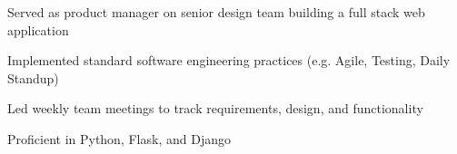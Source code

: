 \documentclass[]{latex/resume}
\begin{document}
\begin{minipage}[t]{0.75\textwidth}
    \sectionsep

     
    \begin{tightemize}
        \item Served as product manager on senior design team building a full stack web application 
        \item Implemented standard software engineering practices (e.g. Agile, Testing, Daily Standup)
        \item Led weekly team meetings to track requirements, design, and functionality
        \item Proficient in Python, Flask, and Django
    \end{tightemize}

    \sectionsep




%
%   

\end{minipage} 
\hfill
\end{document}
